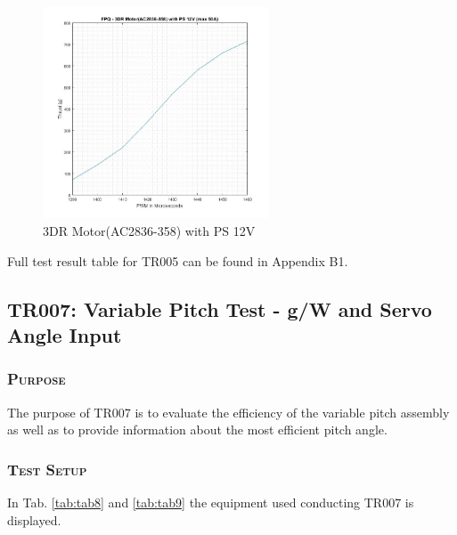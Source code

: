 \begin{figure}[H]
    \centering
    \includegraphics[width = 0.6\textwidth]{VAPIQ-PICTURES/FPQ1}
    \caption{3DR Motor(AC2836-358) with PS 12V}
    \label{fig:fpq1}
\end{figure}

Full test result table for TR005 can be found in Appendix B1.
 
 
\newpage       


\subsection{TR007: Variable Pitch Test - g/W and Servo Angle Input}
         {}


\subsubsection*{\textsc{\medium Purpose}}
The purpose of TR007 is to evaluate the efficiency of the variable pitch assembly as well as to provide information about the most efficient pitch angle. 

\subsubsection*{\textsc{\medium Test Setup}}
In Tab. \ref{tab:tab8} and \ref{tab:tab9} the equipment used conducting TR007 is displayed. 

